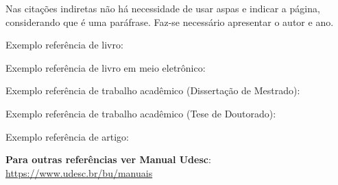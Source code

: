 Nas citações indiretas não há necessidade de usar aspas e indicar a página, considerando que é uma paráfrase. Faz-se necessário apresentar o autor e ano.




\noindent Exemplo referência de livro: \cite{exemplo_livro}

\noindent Exemplo referência de livro em meio eletrônico: \cite{exemplo_livroe}

\noindent Exemplo referência de trabalho acadêmico (Dissertação de Mestrado): \cite{exemplo_dissertacao}

\noindent Exemplo referência de trabalho acadêmico (Tese de Doutorado): \cite{exemplo_tese}

\noindent Exemplo referência de artigo: \cite{exemplo_artigo}


\textbf{Para outras referências ver Manual Udesc}: \url{https://www.udesc.br/bu/manuais}








